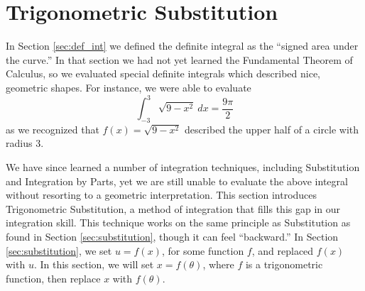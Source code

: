 %


\section{Trigonometric Substitution}\label{sec:trig_sub}

In Section \ref{sec:def_int} we defined the definite integral as the ``signed area under the curve.'' In that section we had not yet learned the Fundamental Theorem of Calculus, so we evaluated special definite integrals which described nice, geometric shapes. For instance, we were able to evaluate
\begin{equation}
\int_{-3}^3\sqrt{9-x^2}\ dx = \frac{9\pi}{2}\label{eq:trigsub1}
\end{equation}
 as we recognized that $f(x) = \sqrt{9-x^2}$ described the upper half of a circle with radius 3. 

We have since learned a number of integration techniques, including Substitution and Integration by Parts, yet we are still unable to evaluate the above integral without resorting to a geometric interpretation. This section introduces Trigonometric Substitution, a method of integration that fills this gap in our integration skill. This technique works on the same principle as Substitution as found in Section \ref{sec:substitution}, though it can feel ``backward.'' In Section \ref{sec:substitution}, we set $u=f(x)$, for some function $f$, and replaced $f(x)$ with $u$. In this section, we will set $x=f(\theta)$, where $f$ is a trigonometric function, then replace $x$ with $f(\theta)$. 


